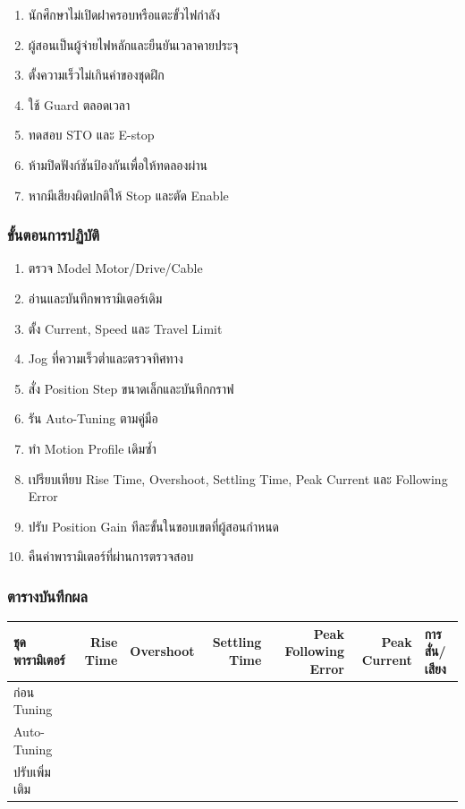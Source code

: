 \begin{enumerate}
    \item นักศึกษาไม่เปิดฝาครอบหรือแตะขั้วไฟกำลัง
    \item ผู้สอนเป็นผู้จ่ายไฟหลักและยืนยันเวลาคายประจุ
    \item ตั้งความเร็วไม่เกินค่าของชุดฝึก
    \item ใช้ Guard ตลอดเวลา
    \item ทดสอบ STO และ E-stop
    \item ห้ามปิดฟังก์ชันป้องกันเพื่อให้ทดลองผ่าน
    \item หากมีเสียงผิดปกติให้ Stop และตัด Enable
\end{enumerate}

\subsubsection{ขั้นตอนการปฏิบัติ}

\begin{enumerate}
    \item ตรวจ Model Motor/Drive/Cable
    \item อ่านและบันทึกพารามิเตอร์เดิม
    \item ตั้ง Current, Speed และ Travel Limit
    \item Jog ที่ความเร็วต่ำและตรวจทิศทาง
    \item สั่ง Position Step ขนาดเล็กและบันทึกกราฟ
    \item รัน Auto-Tuning ตามคู่มือ
    \item ทำ Motion Profile เดิมซ้ำ
    \item เปรียบเทียบ Rise Time, Overshoot, Settling Time, Peak Current และ Following Error
    \item ปรับ Position Gain ทีละขั้นในขอบเขตที่ผู้สอนกำหนด
    \item คืนค่าพารามิเตอร์ที่ผ่านการตรวจสอบ
\end{enumerate}

\subsubsection{ตารางบันทึกผล}

\begin{table}[htbp]
    \centering
    \begin{tabular}{l r r r r r l}
        \hline
        \textbf{ชุดพารามิเตอร์} & \textbf{Rise Time} & \textbf{Overshoot} & \textbf{Settling Time} & \textbf{Peak Following Error} & \textbf{Peak Current} & \textbf{การสั่น/เสียง} \\
        \hline
        ก่อน Tuning &  &  &  &  &  &  \\
        Auto-Tuning &  &  &  &  &  &  \\
        ปรับเพิ่มเติม &  &  &  &  &  &  \\
        \hline
    \end{tabular}
\end{table}

